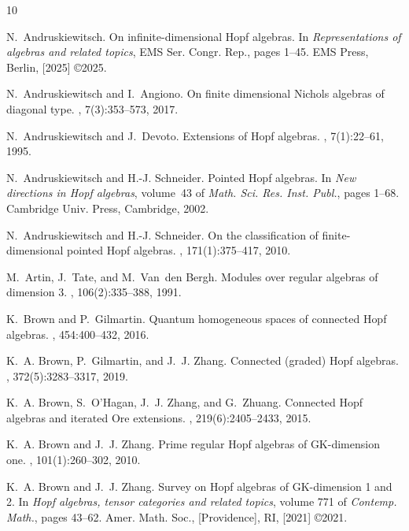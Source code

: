 \documentclass{article}
\theoremstyle{plain}
\theoremstyle{definition}
\numberwithin{equation}{section}
\begin{document}
\begin{thebibliography}{10}

N.~Andruskiewitsch.
\newblock On infinite-dimensional {H}opf algebras.
\newblock In {\em Representations of algebras and related topics}, EMS Ser.
  Congr. Rep., pages 1--45. EMS Press, Berlin, [2025] \copyright 2025.

N.~Andruskiewitsch and I.~Angiono.
\newblock On finite dimensional {N}ichols algebras of diagonal type.
, 7(3):353--573, 2017.

N.~Andruskiewitsch and J.~Devoto.
\newblock Extensions of {H}opf algebras.
, 7(1):22--61, 1995.

N.~Andruskiewitsch and H.-J. Schneider.
\newblock Pointed {H}opf algebras.
\newblock In {\em New directions in {H}opf algebras}, volume~43 of {\em Math.
  Sci. Res. Inst. Publ.}, pages 1--68. Cambridge Univ. Press, Cambridge, 2002.

N.~Andruskiewitsch and H.-J. Schneider.
\newblock On the classification of finite-dimensional pointed {H}opf algebras.
, 171(1):375--417, 2010.

M.~Artin, J.~Tate, and M.~Van~den Bergh.
\newblock Modules over regular algebras of dimension {$3$}.
, 106(2):335--388, 1991.

K.~Brown and P.~Gilmartin.
\newblock Quantum homogeneous spaces of connected {H}opf algebras.
, 454:400--432, 2016.

K.~A. Brown, P.~Gilmartin, and J.~J. Zhang.
\newblock Connected (graded) {H}opf algebras.
, 372(5):3283--3317, 2019.

K.~A. Brown, S.~O'Hagan, J.~J. Zhang, and G.~Zhuang.
\newblock Connected {H}opf algebras and iterated {O}re extensions.
, 219(6):2405--2433, 2015.

K.~A. Brown and J.~J. Zhang.
\newblock Prime regular {H}opf algebras of {GK}-dimension one.
, 101(1):260--302, 2010.

K.~A. Brown and J.~J. Zhang.
\newblock Survey on {H}opf algebras of {GK}-dimension 1 and 2.
\newblock In {\em Hopf algebras, tensor categories and related topics}, volume
  771 of {\em Contemp. Math.}, pages 43--62. Amer. Math. Soc., [Providence],
  RI, [2021] \copyright 2021.


\end{thebibliography}
\end{document}
